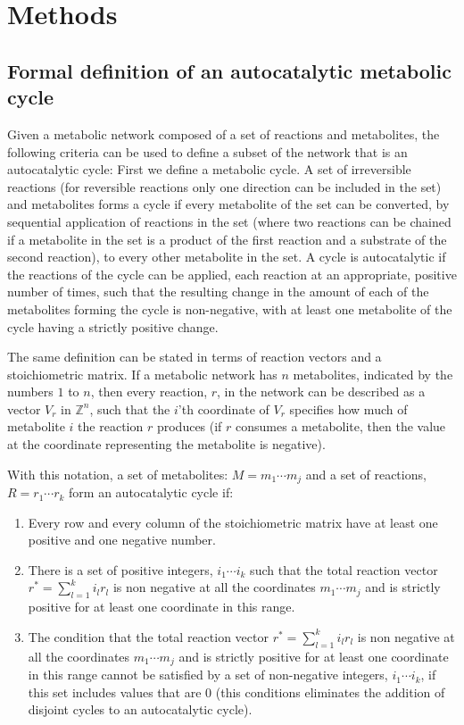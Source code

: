   \section{Methods}
  \renewcommand\thesubsection{\arabic{subsection}}
  \secttoc
  \subsection{Formal definition of an autocatalytic metabolic cycle}
  Given a metabolic network composed of a set of reactions and metabolites, the following criteria can be used to define a subset of the network that is an autocatalytic cycle:
  First we define a metabolic cycle.
A set of irreversible reactions (for reversible reactions only one direction can be included in the set) and metabolites forms a cycle if every metabolite of the set can be converted, by sequential application of reactions in the set (where two reactions can be chained if a metabolite in the set is a product of the first reaction and a substrate of the second reaction), to every other metabolite in the set.
A cycle is autocatalytic if the reactions of the cycle can be applied, each reaction at an appropriate, positive number of times, such that the resulting change in the amount of each of the metabolites forming the cycle is non-negative, with at least one metabolite of the cycle having a strictly positive change.

The same definition can be stated in terms of reaction vectors and a stoichiometric matrix.
If a metabolic network has $n$ metabolites, indicated by the numbers $1$ to $n$, then every reaction, $r$, in the network can be described as a vector $V_r$ in $\mathbb{Z}^n$, such that the $i$'th coordinate of $V_r$ specifies how much of metabolite $i$ the reaction $r$ produces (if $r$ consumes a metabolite, then the value at the coordinate representing the metabolite is negative).

With this notation, a set of metabolites: $M={m_1\cdots m_j}$ and a set of reactions, $R={r_1\cdots r_k}$ form an autocatalytic cycle if:
\begin{enumerate}
    \item Every row and every column of the stoichiometric matrix have at least one positive and one negative number.
    \item There is a set of positive integers, $i_1\cdots i_k$ such that the total reaction vector $r^*=\sum_{l=1}^k i_lr_l$ is non negative at all the coordinates $m_1\cdots m_j$ and is strictly positive for at least one coordinate in this range.
    \item The condition that the total reaction vector $r^*=\sum_{l=1}^k i_lr_l$ is non negative at all the coordinates $m_1\cdots m_j$ and is strictly positive for at least one coordinate in this range cannot be satisfied by a set of non-negative integers, $i_1\cdots i_k$, if this set includes values that are $0$ (this conditions eliminates the addition of disjoint cycles to an autocatalytic cycle).
\end{enumerate}

